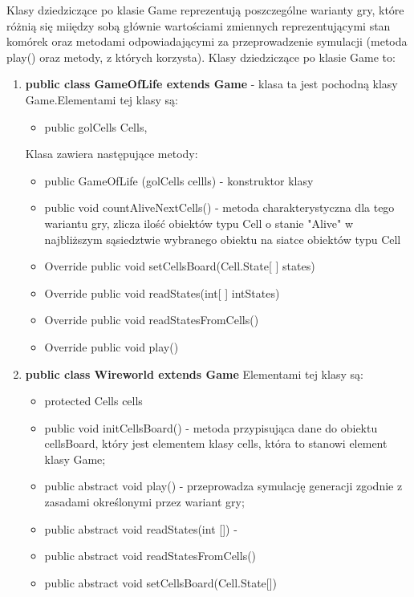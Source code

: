 \documentclass[10pt, oneside]{article}
\begin{document}
\begin{enumerate}
	Klasy dziedziczące po klasie Game reprezentują poszczególne warianty gry, które różnią się miiędzy sobą głównie wartościami zmiennych reprezentującymi stan komórek oraz metodami odpowiadającymi za przeprowadzenie symulacji (metoda play() oraz metody, z których korzysta). Klasy dziedziczące po klasie Game to:
\begin {enumerate}
\item   \textbf {public class GameOfLife extends Game} - klasa ta jest pochodną klasy Game.Elementami tej klasy są:	
	\begin{itemize}
	\item public golCells Cells,
	\end {itemize}

	Klasa zawiera następujące metody:
	\begin {itemize}
	\item 	public GameOfLife (golCells cellls) - konstruktor klasy
	\item  public void countAliveNextCells() - metoda charakterystyczna dla tego wariantu gry, zlicza ilość obiektów typu Cell o stanie "Alive" w najbliższym sąsiedztwie wybranego obiektu na siatce obiektów typu Cell
	\item  Override public void setCellsBoard(Cell.State[ ] states)
	\item  Override public void readStates(int[ ] intStates)
	\item  Override public void readStatesFromCells()
	\item  Override public void play()
	\end{itemize}

\item  \textbf{ public class Wireworld extends Game} 
					Elementami tej klasy są:
	\begin {itemize}
	\item protected Cells cells
	\end {itemize}


	\begin{itemize}
	\item public void initCellsBoard() - metoda przypisująca dane do obiektu cellsBoard, który jest elementem klasy cells, która to stanowi element klasy Game;
	\item public abstract void play() - przeprowadza symulację generacji zgodnie z zasadami określonymi przez wariant gry; 
	\item public abstract void  readStates(int []) - 
	\item public abstract void readStatesFromCells()
	\item public abstract void setCellsBoard(Cell.State[]) 


\end{itemize}
\end{enumerate}
\end{enumerate}
\end{document}
